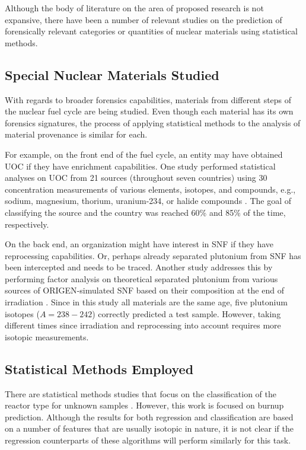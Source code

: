 

Although the body of literature on the area of proposed research is not
expansive, there have been a number of relevant studies on the prediction of
forensically relevant categories or quantities of nuclear materials using
statistical methods. 

\subsection{Special Nuclear Materials Studied}

With regards to broader forensics capabilities, materials from different steps
of the nuclear fuel cycle are being studied.  Even though each material has
its own forensics signatures, the process of applying statistical methods to
the analysis of material provenance is similar for each. 

For example, on the front end of the fuel cycle, an entity may have obtained
\gls{UOC} if they have enrichment capabilities.  One study performed
statistical analyses on \gls{UOC} from 21 sources (throughout seven countries)
using 30 concentration measurements of various elements, isotopes, and
compounds, e.g., sodium, magnesium, thorium, uranium-234, or halide compounds
\cite{robel_2009}.  The goal of classifying the source and the country was
reached 60\% and 85\% of the time, respectively.  

On the back end, an organization might have interest in \gls{SNF} if they have
reprocessing capabilities.  Or, perhaps already separated plutonium from
\gls{SNF} has been intercepted and needs to be traced. Another study addresses
this by performing factor analysis on theoretical separated plutonium from
various sources of \gls{ORIGEN}-simulated \gls{SNF} based on their composition
at the end of irradiation \cite{nicolaou_pu}.  Since in this study all
materials are the same age, five plutonium isotopes ($A = 238-242$) correctly
predicted a test sample. However, taking different times since irradiation and
reprocessing into account requires more isotopic measurements. 

\subsection{Statistical Methods Employed}

There are statistical methods studies that focus on the classification of the
reactor type for unknown samples \cite{robel_2009, nicolaou_pu, jones_snf_2014,
nicolaou_2009}.  However, this work is focused on burnup prediction.  Although
the results for both regression and classification are based on a number of
features that are usually isotopic in nature, it is not clear if the regression
counterparts of these algorithms will perform similarly for this task. 

